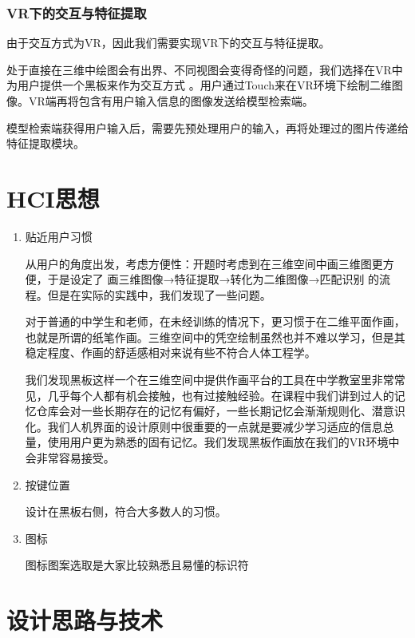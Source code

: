 \documentclass{article}
\begin{document}
\subsubsection{VR下的交互与特征提取}
由于交互方式为VR，因此我们需要实现VR下的交互与特征提取。

处于直接在三维中绘图会有出界、不同视图会变得奇怪的问题，我们选择在VR中为用户提供一个黑板来作为交互方式
。用户通过Touch来在VR环境下绘制二维图像。VR端再将包含有用户输入信息的图像发送给模型检索端。

模型检索端获得用户输入后，需要先预处理用户的输入，再将处理过的图片传递给特征提取模块。

\section{HCI思想}
\begin{enumerate}
    \item 贴近用户习惯
    
    \qquad 从用户的角度出发，考虑方便性：开题时考虑到在三维空间中画三维图更方便，于是设定了 画三维图像→特征提取→转化为二维图像→匹配识别 的流程。但是在实际的实践中，我们发现了一些问题。
    
    \qquad 对于普通的中学生和老师，在未经训练的情况下，更习惯于在二维平面作画，也就是所谓的纸笔作画。三维空间中的凭空绘制虽然也并不难以学习，但是其稳定程度、作画的舒适感相对来说有些不符合人体工程学。
    
    \qquad 我们发现黑板这样一个在三维空间中提供作画平台的工具在中学教室里非常常见，几乎每个人都有机会接触，也有过接触经验。在课程中我们讲到过人的记忆仓库会对一些长期存在的记忆有偏好，一些长期记忆会渐渐规则化、潜意识化。我们人机界面的设计原则中很重要的一点就是要减少学习适应的信息总量，使用用户更为熟悉的固有记忆。我们发现黑板作画放在我们的VR环境中会非常容易接受。

    \item 按键位置
    
    设计在黑板右侧，符合大多数人的习惯。
    
    \item 图标
    
    图标图案选取是大家比较熟悉且易懂的标识符
    
\end{enumerate}

\clearpage

\section{设计思路与技术}
\end{document}
